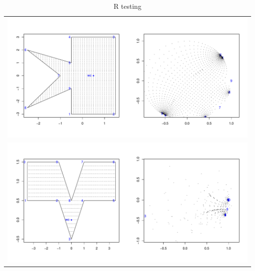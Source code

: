 \documentclass[a4paper,10pt]{amsart}
\newcommand{\sch}{Schwarz-Christoffel }
\begin{document}
\begin{table}
\begin{tabular}{c}
\includegraphics[scale=0.25]{figs/R-test-5.pdf} \\
\includegraphics[scale=0.25]{figs/R-test-6.pdf} \\
\end{tabular}
\caption{R testing}
\label{rtest}
\end{table}










\end{document}
